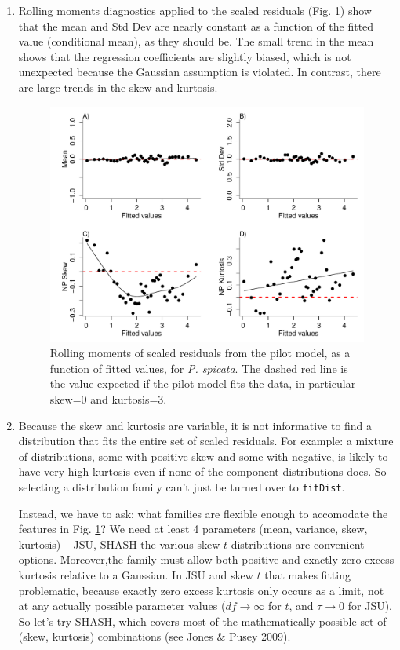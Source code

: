 \documentclass[11pt]{article}
\begin{document}
{\begin{enumerate}
\item Rolling moments diagnostics applied to the scaled residuals (Fig. \ref{fig:rollingMomentsPSSP}) show that the mean 
and Std Dev are nearly constant as a function of the fitted value (conditional mean), as they should be. The small trend in 
the mean shows that the regression coefficients are slightly biased, which is not unexpected because the Gaussian assumption is violated. 
In contrast, there are large trends in the skew and kurtosis. 

\begin{figure}[tbp]
\centering
\includegraphics[width=.9\textwidth]{figures/RollingNPMomentsPSSP.pdf}
\caption{Rolling moments of scaled residuals from the pilot model, as a function of fitted
values, for \emph{P. spicata}. The dashed red line is the value expected if the pilot model fits the
data, in particular skew=0 and kurtosis=3.}
\label{fig:rollingMomentsPSSP}
\end{figure} 

\item Because the skew and kurtosis are variable, it is not informative to find a distribution that fits
the entire set of scaled residuals. For example: a mixture of distributions, some with positive skew and some
with negative, is likely to have very high kurtosis even if none of the component distributions does. So selecting
a distribution family can't just be turned over to \texttt{fitDist}. 

Instead, we have to ask: what families are flexible enough to accomodate the features in Fig. \ref{fig:rollingMomentsPSSP}?
We need at least 4 parameters (mean, variance, skew, kurtosis) -- JSU, SHASH the various skew $t$ distributions 
are convenient options. Moreover,the family must allow both positive and exactly zero excess kurtosis relative to a Gaussian. 
In JSU and skew $t$ that makes fitting problematic, because exactly zero excess kurtosis only occurs as a limit, not at 
any actually possible parameter values ($df \to \infty$ for $t$, and $\tau \to 0$ for JSU). So let's try SHASH, which covers most
of the mathematically possible set of (skew, kurtosis) combinations (see Jones \& Pusey 2009).  


\end{enumerate}}
\end{document}
